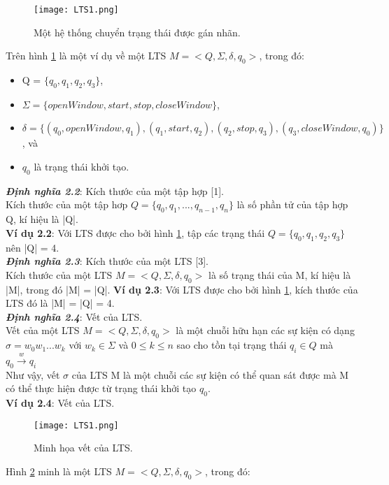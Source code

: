 \documentclass[a4paper,13pt,oneside,openany]{book}
\begin{document}
\begin{flushleft}
\begin{figure}[h]
			\centering
			\texttt{[image: LTS1.png]}
			\caption{Một hệ thống chuyển trạng thái được gán nhãn.}
			\label{fig:LTS1}
		\end{figure}
		Trên hình \ref{fig:LTS1} là một ví dụ về một LTS $M = <Q, \Sigma, \delta, q_{0}>$, trong đó:
		\begin{itemize}
			\item Q = $\{q_0, q_1, q_2, q_3\}$,
			\item $\Sigma = \{openWindow, start, stop, closeWindow\}$,
			\item $\delta = \{(q_0, openWindow, q_1), (q_1, start, q_2), (q_2, stop, q_3), (q_3, closeWindow, q_0)\}$, và
			\item $q_0$ là trạng thái khởi tạo.
		\end{itemize}
		\textbf{\textit{Định nghĩa 2.2}}: Kích thước của một tập hợp [1].\\
		Kích thước của một tập hơp $Q = \{q_0, q_1, ..., q_{n-1}, q_n\}$ là số phần tử của tập hợp Q, kí hiệu là |Q|.\\
		\textbf{Ví dụ 2.2}: Với LTS được cho bởi hình \ref{fig:LTS1}, tập các trạng thái $Q = \{q_0, q_1, q_2, q_3\}$ nên |Q| = 4.\\
		\textbf{\textit{Định nghĩa 2.3}}: Kích thước của một LTS [3].\\
		Kích thước của một LTS $M = <Q, \Sigma, \delta, q_{0}>$ là số trạng thái của M, kí hiệu là |M|, trong đó |M| = |Q|.
		\textbf{Ví dụ 2.3}: Với LTS được cho bởi hình \ref{fig:LTS1}, kích thước của LTS đó là |M| = |Q| = 4.\\
		\textbf{\textit{Định nghĩa 2.4}}: Vết của LTS.\\
		Vết của một LTS $M = <Q, \Sigma, \delta, q_{0}>$ là một chuỗi hữu hạn các sự kiện có dạng $\sigma = w_0w_1...w_k$ với $w_k \in \Sigma$ và $0 \leq k \leq n$ sao cho tồn tại trạng thái $q_i \in Q$ mà $q_0 \overset{w}{\longrightarrow} q_{i}$\\
		Như vậy, vết $\sigma$ của LTS M là một chuỗi các sự kiện có thể quan sát được mà M có thể thực hiện được từ trạng thái khởi tạo $q_0$.\\
		\textbf{Ví dụ 2.4}: Vết của LTS.\\
		\begin{figure}[h]
			\centering
			\texttt{[image: LTS1.png]}
			\caption{Minh họa vết của LTS.}
			\label{fig:LTS2}
		\end{figure}
		Hình \ref{fig:LTS2} minh là một LTS $M = <Q, \Sigma, \delta, q_{0}>$, trong đó:
		\begin{itemize}

\end{itemize}
\end{flushleft}
\end{document}
